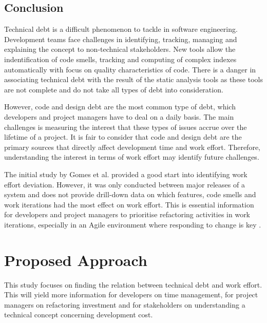 \documentclass{mprop}
\begin{document}
\subsection{Conclusion}

Technical debt is a difficult phenomenon to tackle in software engineering.
Development teams face challenges in identifying, tracking, managing and
explaining the concept to non-technical stakeholders. New tools allow the
indentification of code smells, tracking and computing of complex indexes
automatically with focus on quality characteristics of code. There is a danger
in associating technical debt with the result of the static analysis tools as
these tools are not complete and do not take all types of debt into
consideration.

However, code and design debt are the most common type of debt, which developers
and project managers have to deal on a daily basis. The main challenges is
measuring the interest that these types of issues accrue over the lifetime of a
project. It is fair to consider that code and design debt are the primary
sources that directly affect development time and work effort. Therefore,
understanding the interest in terms of work effort may identify future
challenges.

The initial study by Gomes et al. \cite{Gomes2011} provided a good start into
identifying work effort deviation. However, it was only conducted between major
releases of a system and does not provide drill-down data on which features,
code smells and work iterations had the most effect on work effort. This is
essential information for developers and project managers to prioritise
refactoring activities in work iterations, especially in an Agile environment
where responding to change is key \cite{agile-manifesto}.  

\section{Proposed Approach}
\label{proposed-work}

This study focuses on finding the relation between technical debt and work
effort. This will yield more information for developers on time management, for
project managers on refactoring investment and for stakeholders on understanding
a technical concept concerning development cost.
\end{document}
